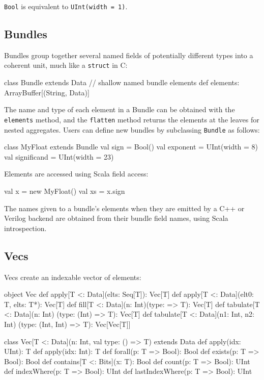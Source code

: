 \documentclass[10pt,twocolumn]{article}
\def\code#1{{\small\tt #1}}
\begin{document}
\noindent
\code{Bool} is equivalent to \code{UInt(width = 1)}.

\subsection{Bundles}

Bundles group together several named fields of potentially different
types into a coherent unit, much like a \code{struct} in C:

\begin{scala}
class Bundle extends Data {
  // shallow named bundle elements
  def elements: ArrayBuffer[(String, Data)]
}
\end{scala}

\noindent
The name and type of each element in a Bundle can be obtained with the
\code{elements} method, and the \code{flatten} method returns the
elements at the leaves for nested aggregates.  Users can define new
bundles by subclassing \code{Bundle} as follows:

\begin{scala}
class MyFloat extends Bundle {
  val sign        = Bool()
  val exponent    = UInt(width = 8)
  val significand = UInt(width = 23)
}
\end{scala}
\noindent
Elements are accessed using Scala field access:

\begin{scala}
val x  = new MyFloat()
val xs = x.sign
\end{scala}

The names given to a bundle's elements when they are emitted by a C++
or Verilog backend are obtained from their bundle field names, using
Scala introspection.

\subsection{Vecs}

Vecs create an indexable vector of elements: 

\begin{scala}
object Vec {
  def apply[T <: Data](elts: Seq[T]): Vec[T]
  def apply[T <: Data](elt0: T, elts: T*): Vec[T]
  def fill[T <: Data](n: Int)(type: => T): Vec[T]
  def tabulate[T <: Data](n: Int)
        (type: (Int) => T): Vec[T]
  def tabulate[T <: Data](n1: Int, n2: Int)
        (type: (Int, Int) => T): Vec[Vec[T]]
}

class Vec[T <: Data](n: Int, val type: () => T) 
    extends Data {
  def apply(idx: UInt): T
  def apply(idx: Int): T
  def forall(p: T => Bool): Bool
  def exists(p: T => Bool): Bool
  def contains[T <: Bits](x: T): Bool
  def count(p: T => Bool): UInt
  def indexWhere(p: T => Bool): UInt
  def lastIndexWhere(p: T => Bool): UInt
}
\end{scala}
\end{document}
